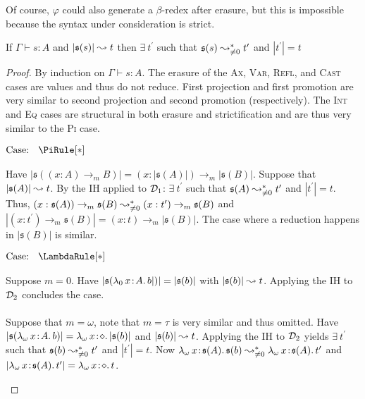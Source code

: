 Of course, $\varphi$ could also generate a $\beta$-redex after erasure, but this is impossible because the syntax under consideration is strict.
\begin{lemma}
    \label{lem:5:strict_erase_red_step}
    If $\Gamma \vdash s : A$ and $|\mathfrak{s}(s)| \leadsto t$ then $\exists\ t^\prime$ such that $\mathfrak{s}(s) \leadsto^*_{\neq 0} t^\prime$ and $|t^\prime| = t$
\end{lemma}
\begin{proof}
    By induction on $\Gamma \vdash s : A$.
    The erasure of the \textsc{Ax}, \textsc{Var}, \textsc{Refl}, and \textsc{Cast} cases are values and thus do not reduce.
    First projection and first promotion are very similar to second projection and second promotion (respectively).
    The \textsc{Int} and \textsc{Eq} cases are structural in both erasure and strictification and are thus very similar to the \textsc{Pi} case.

    $\text{Case: }\begin{array}{c} \PiRule[*] \end{array}$
    \begin{proofcase}
        Have $|\mathfrak{s}((x : A) \to_m B)| = (x : |\mathfrak{s}(A)|) \to_m |\mathfrak{s}(B)|$.
        Suppose that $|\mathfrak{s}(A)| \leadsto t$.
        By the IH applied to $\mathcal{D}_{1}$: $\exists\ t^\prime$ such that $\mathfrak{s}(A) \leadsto^*_{\neq 0} t^\prime$ and $|t^\prime| = t$.
        Thus, $(x : \mathfrak{s}(A)) \to_m \mathfrak{s}(B) \leadsto^*_{\neq 0} (x : t^\prime) \to_m \mathfrak{s}(B)$ and $|(x : t^\prime) \to_m \mathfrak{s}(B)| = (x : t) \to_m |\mathfrak{s}(B)|$.
        The case where a reduction happens in $|\mathfrak{s}(B)|$ is similar.
    \end{proofcase}

    $\text{Case: }\begin{array}{c} \LambdaRule[*] \end{array}$
    \begin{proofcase}
        Suppose $m = 0$.
        Have $|\mathfrak{s}({\lambda_0}\, x\! : \! A.\, b|)| = |\mathfrak{s}(b)|$ with $|\mathfrak{s}(b)| \leadsto t$.
        Applying the IH to $\mathcal{D}_{2}$ concludes the case.
        \\ \\
        Suppose that $m = \omega$, note that $m = \tau$ is very similar and thus omitted.
        Have $|\mathfrak{s}({\lambda_\omega}\, x\! : \! A.\, b)| = {\lambda_\omega}\, x\! : \! \diamond.\, |\mathfrak{s}(b)|$ and $|\mathfrak{s}(b)| \leadsto t$.
        Applying the IH to $\mathcal{D}_{2}$ yields $\exists\ t^\prime$ such that $\mathfrak{s}(b) \leadsto^*_{\neq 0} t^\prime$ and $|t^\prime| = t$.
        Now ${\lambda_\omega}\, x\! : \! \mathfrak{s}(A).\, \mathfrak{s}(b) \leadsto^*_{\neq 0} {\lambda_\omega}\, x\! : \! \mathfrak{s}(A).\, t^\prime$ and $|{\lambda_\omega}\, x\! : \! \mathfrak{s}(A).\, t^\prime| = {\lambda_\omega}\, x\! : \! \diamond.\, t$.
    \end{proofcase}


\end{proof}
